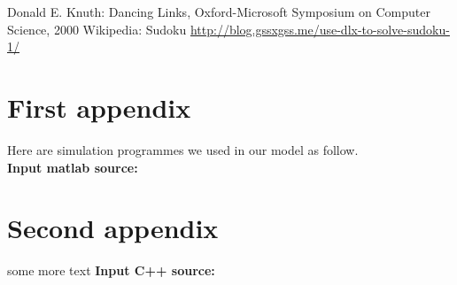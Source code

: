 \documentclass{mcmthesis}
\begin{document}
\begin{thebibliography}{99}
 Donald E. Knuth: Dancing Links, Oxford-Microsoft Symposium on Computer Science, 2000
	Wikipedia: Sudoku
\url{http://blog.gssxgss.me/use-dlx-to-solve-sudoku-1/}
\end{thebibliography}

\begin{appendices}

\section{First appendix}

Here are simulation programmes we used in our model as follow.\\

\textbf{\textcolor[rgb]{0.98,0.00,0.00}{Input matlab source:}}


\section{Second appendix}

some more text \textcolor[rgb]{0.98,0.00,0.00}{\textbf{Input C++ source:}}


\end{appendices}
\end{document}
